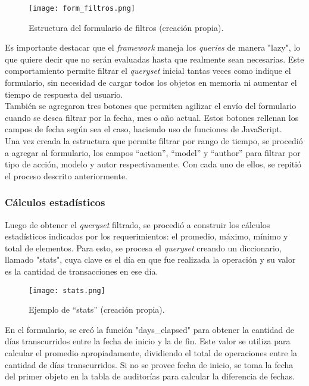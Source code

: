\begin{figure}[h]
\centering
\texttt{[image: form\_filtros.png]}
\caption{Estructura del formulario de filtros (creación propia).}
\label{fig:figura6.9}
\end{figure}


Es importante destacar que el \textit{framework} maneja los \textit{queries} de manera "lazy", lo que quiere decir que no serán evaluadas hasta que realmente sean necesarias. Este comportamiento permite filtrar el \textit{queryset} inicial tantas veces como indique el formulario, sin necesidad de cargar todos los objetos en memoria ni aumentar el tiempo de respuesta del usuario.\\

También se agregaron tres botones que permiten agilizar el envío del formulario cuando se desea filtrar por la fecha, mes o año actual. Estos botones rellenan los campos de fecha según sea el caso, haciendo uso de funciones de JavaScript.\\

Una vez creada la estructura que permite filtrar por rango de tiempo, se procedió a agregar al formulario, los campos “action”, “model” y “author” para filtrar por tipo de acción, modelo y autor respectivamente. Con cada uno de ellos, se repitió el proceso descrito anteriormente.

\subsubsection{Cálculos estadísticos}

Luego de obtener el \textit{queryset} filtrado, se procedió a construir los cálculos estadísticos indicados por los requerimientos: el promedio, máximo, mínimo y total de elementos. Para esto, se procesa el \textit{queryset} creando un diccionario, llamado "stats",  cuya clave es el día en que fue realizada la operación y su valor es la cantidad de transacciones en ese día.\\

\begin{figure}[h]
\centering
\texttt{[image: stats.png]}
\caption{Ejemplo de “stats” (creación propia).}
\label{fig:figura6.10}
\end{figure}

En el formulario, se creó la función "days\_elapsed" para obtener la cantidad de días transcurridos entre la fecha de inicio y la de fin. Este valor se utiliza para calcular el promedio apropiadamente, dividiendo el total de operaciones entre la cantidad de días transcurridos. Si no se provee fecha de inicio, se toma la fecha del primer objeto en la tabla de auditorías para calcular la diferencia de fechas.\\

